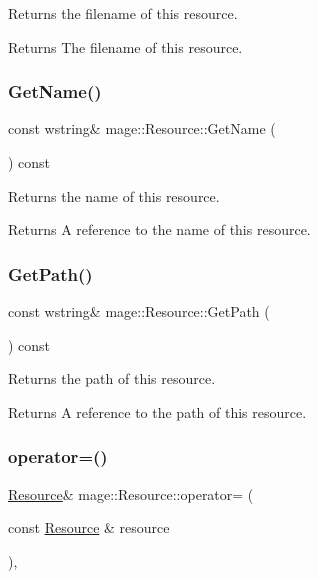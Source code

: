 Returns the filename of this resource.

\begin{DoxyReturn}{Returns}
The filename of this resource. 
\end{DoxyReturn}
\hypertarget{classmage_1_1_resource_a49a7e0c571a266b0c3ddf20979c491c8}{}\label{classmage_1_1_resource_a49a7e0c571a266b0c3ddf20979c491c8} 
\subsubsection{\texorpdfstring{Get\+Name()}{GetName()}}
{\footnotesize\ttfamily const wstring\& mage\+::\+Resource\+::\+Get\+Name (\begin{DoxyParamCaption}{ }\end{DoxyParamCaption}) const}

Returns the name of this resource.

\begin{DoxyReturn}{Returns}
A reference to the name of this resource. 
\end{DoxyReturn}
\hypertarget{classmage_1_1_resource_af1066ff99a6b3238de9702ddc971ffe0}{}\label{classmage_1_1_resource_af1066ff99a6b3238de9702ddc971ffe0} 
\subsubsection{\texorpdfstring{Get\+Path()}{GetPath()}}
{\footnotesize\ttfamily const wstring\& mage\+::\+Resource\+::\+Get\+Path (\begin{DoxyParamCaption}{ }\end{DoxyParamCaption}) const}

Returns the path of this resource.

\begin{DoxyReturn}{Returns}
A reference to the path of this resource. 
\end{DoxyReturn}
\hypertarget{classmage_1_1_resource_ad8fa57f37eb253b90d18d33383b12875}{}\label{classmage_1_1_resource_ad8fa57f37eb253b90d18d33383b12875} 
\subsubsection{\texorpdfstring{operator=()}{operator=()}}
{\footnotesize\ttfamily \hyperlink{classmage_1_1_resource}{Resource}\& mage\+::\+Resource\+::operator= (\begin{DoxyParamCaption}\item[{const \hyperlink{classmage_1_1_resource}{Resource} \&}]{resource }\end{DoxyParamCaption})\hspace{0.3cm}{\ttfamily [private]}, {\ttfamily [delete]}}

